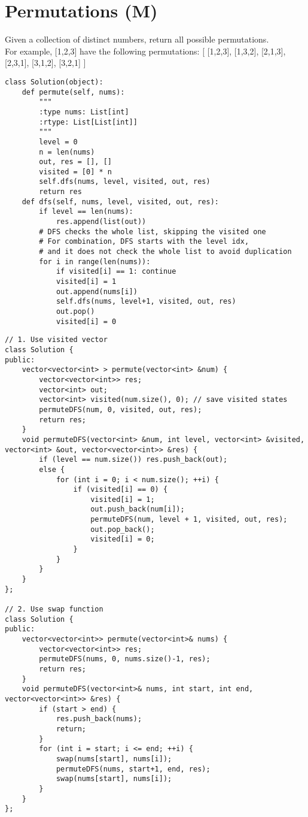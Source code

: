 \section{Permutations (M)}
Given a collection of distinct numbers, return all possible permutations. \\

For example,
[1,2,3] have the following permutations: [ [1,2,3], [1,3,2], [2,1,3], [2,3,1], [3,1,2], [3,2,1] ]\\

\begin{lstlisting}
class Solution(object):
    def permute(self, nums):
        """
        :type nums: List[int]
        :rtype: List[List[int]]
        """
        level = 0
        n = len(nums)
        out, res = [], []
        visited = [0] * n
        self.dfs(nums, level, visited, out, res)
        return res
    def dfs(self, nums, level, visited, out, res):
        if level == len(nums):
            res.append(list(out))
        # DFS checks the whole list, skipping the visited one
        # For combination, DFS starts with the level idx, 
        # and it does not check the whole list to avoid duplication
        for i in range(len(nums)):
            if visited[i] == 1: continue
            visited[i] = 1
            out.append(nums[i])
            self.dfs(nums, level+1, visited, out, res)
            out.pop()
            visited[i] = 0
\end{lstlisting}

\begin{lstlisting}
// 1. Use visited vector
class Solution {
public:
    vector<vector<int> > permute(vector<int> &num) {
        vector<vector<int>> res;
        vector<int> out;
        vector<int> visited(num.size(), 0); // save visited states
        permuteDFS(num, 0, visited, out, res);
        return res;
    }
    void permuteDFS(vector<int> &num, int level, vector<int> &visited, vector<int> &out, vector<vector<int>> &res) {
        if (level == num.size()) res.push_back(out);
        else {
            for (int i = 0; i < num.size(); ++i) {
                if (visited[i] == 0) {
                    visited[i] = 1;
                    out.push_back(num[i]);
                    permuteDFS(num, level + 1, visited, out, res);
                    out.pop_back();
                    visited[i] = 0;
                }
            }
        }
    }
};

// 2. Use swap function
class Solution {
public:
    vector<vector<int>> permute(vector<int>& nums) {
        vector<vector<int>> res;
        permuteDFS(nums, 0, nums.size()-1, res);
        return res;
    }
    void permuteDFS(vector<int>& nums, int start, int end, vector<vector<int>> &res) {
        if (start > end) {
            res.push_back(nums);
            return;
        }
        for (int i = start; i <= end; ++i) {
            swap(nums[start], nums[i]);
            permuteDFS(nums, start+1, end, res);
            swap(nums[start], nums[i]);
        }
    }
};
\end{lstlisting}


